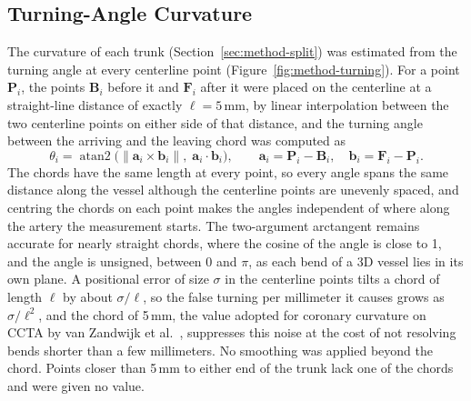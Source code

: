 \subsection{Turning-Angle Curvature}
\label{sec:method-curvature}

The curvature of each trunk (Section~\ref{sec:method-split}) was estimated from the turning angle at every centerline point (Figure~\ref{fig:method-turning}).
For a point $\mathbf{P}_i$, the points $\mathbf{B}_i$ before it and $\mathbf{F}_i$ after it were placed on the centerline at a straight-line distance of exactly $\ell = 5$\,mm, by linear interpolation between the two centerline points on either side of that distance, and the turning angle between the arriving and the leaving chord was computed as
\begin{equation}
  \theta_i = \operatorname{atan2}\bigl(\lVert \mathbf{a}_i \times \mathbf{b}_i \rVert,\; \mathbf{a}_i \cdot \mathbf{b}_i\bigr),
  \qquad \mathbf{a}_i = \mathbf{P}_i - \mathbf{B}_i,\quad \mathbf{b}_i = \mathbf{F}_i - \mathbf{P}_i .
  \label{eq:method-turn}
\end{equation}
The chords have the same length at every point, so every angle spans the same distance along the vessel although the centerline points are unevenly spaced, and centring the chords on each point makes the angles independent of where along the artery the measurement starts.
The two-argument arctangent remains accurate for nearly straight chords, where the cosine of the angle is close to 1, and the angle is unsigned, between $0$ and $\pi$, as each bend of a 3D vessel lies in its own plane.
A positional error of size $\sigma$ in the centerline points tilts a chord of length $\ell$ by about $\sigma/\ell$, so the false turning per millimeter it causes grows as $\sigma/\ell^2$, and the chord of 5\,mm, the value adopted for coronary curvature on CCTA by van Zandwijk et al.\ \cite{vanzandwijk2019curvature}, suppresses this noise at the cost of not resolving bends shorter than a few millimeters.
No smoothing was applied beyond the chord.
Points closer than 5\,mm to either end of the trunk lack one of the chords and were given no value.

